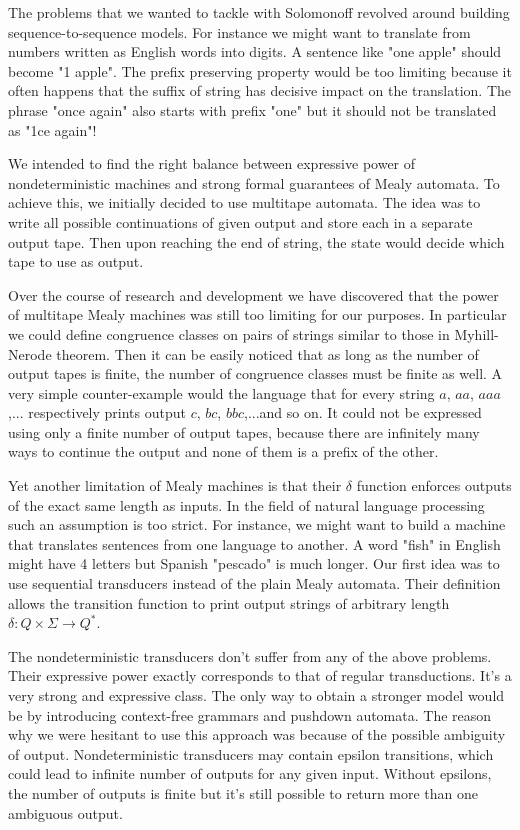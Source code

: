 The problems that we wanted to tackle with Solomonoff revolved around building sequence-to-sequence models. For instance we might want to translate from numbers written as English words into digits. A sentence like "one apple" should become "1 apple". The prefix preserving property would be too limiting because it often happens that the suffix of string has decisive impact on the translation. The phrase "once again"
also starts with prefix "one" but it should not be translated as "1ce again"!

We intended to find the right balance between expressive power of nondeterministic machines and strong formal guarantees of Mealy automata. To achieve this, we initially decided to use multitape automata\cite{TRANSDUCERS}. The idea was to write all possible continuations of given output and store each in a separate output tape. Then upon reaching the end of string, the state would decide which tape to use as output. 

Over the course of research and development we have discovered that the power of multitape Mealy machines was still too limiting for our purposes. In particular we could define congruence classes on pairs of strings similar to those in Myhill-Nerode theorem\cite{sipser}. Then it can be easily noticed that as long as the number of output tapes is finite, the number of congruence classes must be finite as well. A very simple counter-example would the language that for every string $a$, $aa$, $aaa$,... respectively prints output $c$, $bc$, $bbc$,...and so on. It could not be expressed using only a finite number of output tapes, because there are infinitely many ways to continue the output and none of them is a prefix of the other.  



Yet another limitation of Mealy machines is that their $\delta$ function enforces outputs of the exact same length as inputs. In the field of natural language processing such an assumption is too strict. For instance, we might want to 
build a machine that translates sentences from one language to another. A word "fish" in English might have 4 letters but Spanish "pescado" is much longer. Our first idea was to use sequential transducers instead of the plain Mealy automata. Their definition allows the transition function to print output strings of arbitrary length $\delta:Q\times \Sigma \rightarrow Q^*$. 


The nondeterministic transducers\cite{MOHRI}\cite{MOHRI2}\cite{MOHRI3}  don't suffer from any of the above problems. Their expressive power exactly corresponds to that of regular transductions. It's a very strong and expressive class. The only way to obtain a stronger model would be by introducing context-free grammars and pushdown automata. The reason why we were hesitant to use this approach was because of the possible ambiguity of output\cite{Marie-Pierre}. Nondeterministic transducers may contain epsilon transitions, which could lead to infinite number of outputs\cite{MendozaDrosik2020MultitapeAA} for any given input. Without epsilons, the number of outputs is finite but it's still possible to return more than one ambiguous output.

